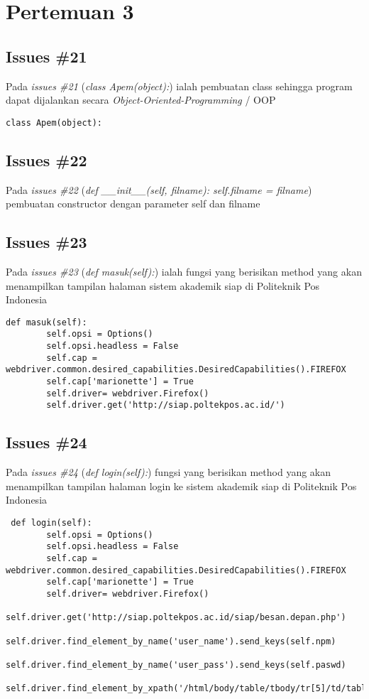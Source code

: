 \chapter{Pertemuan 3}
\section{Issues \#21}
Pada \textit{issues \#21} (\textit{class Apem(object):}) ialah pembuatan class sehingga program dapat dijalankan secara \textit{Object-Oriented-Programming} / OOP 
\begin{verbatim}
class Apem(object): 
\end{verbatim}
\section{Issues \#22}
Pada \textit{issues \#22} (\textit{def \_\_init\_\_(self, filname): self.filname = filname}) pembuatan constructor dengan parameter self dan filname
\section{Issues \#23}
Pada \textit{issues \#23} (\textit{def masuk(self):}) ialah fungsi yang berisikan method yang akan menampilkan tampilan halaman sistem akademik siap di Politeknik Pos Indonesia
\begin{verbatim}
def masuk(self): 
        self.opsi = Options()
        self.opsi.headless = False
        self.cap = webdriver.common.desired_capabilities.DesiredCapabilities().FIREFOX
        self.cap['marionette'] = True
        self.driver= webdriver.Firefox()
        self.driver.get('http://siap.poltekpos.ac.id/')
\end{verbatim}
\section{Issues \#24}
Pada \textit{issues \#24} (\textit{def login(self):}) fungsi yang berisikan method yang akan menampilkan tampilan halaman login ke sistem akademik siap di Politeknik Pos Indonesia
\begin{verbatim}
 def login(self): 
        self.opsi = Options()
        self.opsi.headless = False
        self.cap = webdriver.common.desired_capabilities.DesiredCapabilities().FIREFOX
        self.cap['marionette'] = True
        self.driver= webdriver.Firefox()
        self.driver.get('http://siap.poltekpos.ac.id/siap/besan.depan.php')
        self.driver.find_element_by_name('user_name').send_keys(self.npm)
        self.driver.find_element_by_name('user_pass').send_keys(self.paswd)
        self.driver.find_element_by_xpath('/html/body/table/tbody/tr[5]/td/table[1]/tbody/tr/td[2]/table[2]/tbody/tr[1]/td[2]/div/form/input[4]').click()
\end{verbatim}

